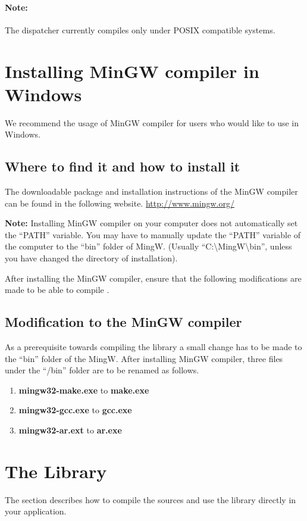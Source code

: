 \paragraph{Note:}
The dispatcher currently compiles only under POSIX compatible systems. 

\section*{Installing MinGW compiler in Windows}
We recommend the usage of MinGW compiler for users who would like to use \libalf in Windows. 

\subsection*{Where to find it and how to install it}
The downloadable package and installation instructions of the MinGW compiler can be found in the following website.
\url{http://www.mingw.org/} \vskip 1pt

\textbf{Note:} Installing MinGW compiler on your computer does not automatically set the ``PATH'' variable. You may have to manually update the “PATH” variable of the computer to the ``bin'' folder of MingW. (Usually ``C:\textbackslash MingW\textbackslash bin'', unless you have changed the directory of installation). 

After installing the MinGW compiler, ensure that the following modifications are made to be able to compile \libalf.

\subsection*{Modification to the MinGW compiler}

As a prerequisite towards compiling the library a small change has to be made to the ``bin'' folder of the MingW.   
After installing MinGW compiler, three files under the ``/bin'' folder are to be renamed as follows.
\begin{enumerate}
 \item \textbf{mingw32-make.exe} to \textbf{make.exe}
 \item \textbf{mingw32-gcc.exe} to \textbf{gcc.exe}
 \item \textbf{mingw32-ar.ext} to \textbf{ar.exe}	
\end{enumerate}
 
\section{The \libalf \cpp Library}
The section describes how to compile the sources and use the \cpp library directly in your application.
